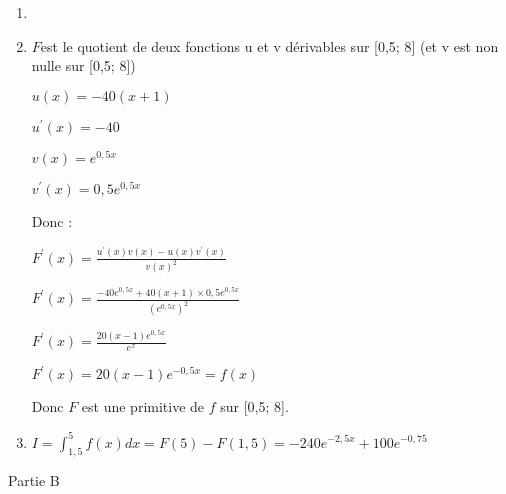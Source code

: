 \begin{corrige}
\begin{enumerate}
\begin{enumerate}
\begin{center}
\begin{extern}
{
      }
   \end{extern}
\end{center}
\end{enumerate}
          \item
\\
\begin{center}
\end{center}
          \item
          $F $est le quotient de deux fonctions u et v dérivables sur [0,5; 8] (et v est non nulle sur [0,5; 8])
          \par
          $u\left(x\right)=-40\left(x+1\right)$
          \par
          $u^{\prime}\left(x\right)=-40$
          \par
          $v\left(x\right)=e^{0,5x}$
          \par
          $v^{\prime}\left(x\right)=0,5e^{0,5x}$
          \par
          Donc :
          \par
          $F^{\prime}\left(x\right)=\frac{u^{\prime}\left(x\right)v\left(x\right)-u\left(x\right)v^{\prime}\left(x\right)}{v\left(x\right)^{2}}$
          \par
          $F^{\prime}\left(x\right) = \frac{-40e^{0,5x}+40\left(x+1\right)\times 0,5e^{0,5x}}{\left(e^{0,5x}\right)^{2}}$
          \par
          $F^{\prime}\left(x\right) = \frac{20\left(x-1\right)e^{0,5x}}{e^{x}}$
          \par
          $F^{\prime}\left(x\right) = 20\left(x-1\right)e^{-0,5x}=f\left(x\right)$
          \par
          Donc $F$ est une primitive de $f$ sur [0,5; 8].
          \item
          $I=\int_{1,5}^{5}f\left(x\right)dx=F\left(5\right)-F\left(1,5\right)=-240e^{-2,5x}+100e^{-0,75}$
     \end{enumerate}
     \begin{h3}Partie B\end{h3}

\end{corrige}
